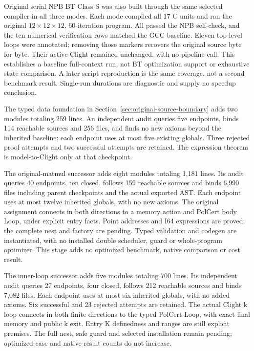 Original serial NPB BT Class S was also built through the same selected
compiler in all three modes. Each mode compiled all 17 C units and ran the
original $12\times12\times12$, 60-iteration program. All passed the NPB
self-check, and the ten numerical verification rows matched the GCC baseline.
Eleven top-level  loops were annotated; removing those
markers recovers the original source byte for byte. Their active Clight
remained unchanged, with no pipeline call. This establishes a baseline
full-context run, not BT optimization support or exhaustive state comparison.
A later script reproduction is the same coverage, not a second benchmark
result. Single-run durations are diagnostic and supply no speedup conclusion.

The typed data foundation in Section~\ref{sec:original-source-boundary} adds
two modules totaling 259 lines. An independent audit queries five endpoints,
binds 114 reachable sources and 256 files, and finds no new axioms beyond the
inherited baseline; each endpoint uses at most five existing globals. Three
rejected proof attempts and two successful attempts are retained. The
expression theorem is model-to-Clight only at that checkpoint.

The original-matmul successor adds eight modules totaling 1,181 lines. Its
audit queries 40 endpoints, ten closed, follows 159 reachable sources and
binds 6,990 files including parent checkpoints and the actual exported AST.
Each endpoint uses at most twelve inherited globals, with no new axioms.
The original assignment connects in both directions to a memory action and
PolCert body Loop, under explicit entry facts. Point addresses and I64
expressions are proved; the complete nest and factory are pending. Typed
validation and codegen are instantiated, with no installed double scheduler,
guard or whole-program optimizer. This stage adds no optimized benchmark,
native comparison or cost result.

The inner-loop successor adds five modules totaling 700 lines. Its independent
audit queries 27 endpoints, four closed, follows 212 reachable sources and
binds 7,082 files. Each endpoint uses at most six inherited globals, with no
added axioms. Six successful and 23 rejected attempts are retained. The actual
Clight k loop connects in both finite directions to the typed PolCert Loop,
with exact final memory and public k exit. Entry K definedness and ranges are
still explicit premises. The full nest, safe guard and selected installation
remain pending; optimized-case and native-result counts do not increase.

